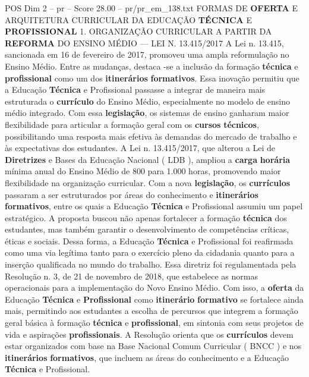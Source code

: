\begin{textsample}{POS Dim 2 – pr – Score 28.00 – pr/pr\_em\_138.txt}  \label{ex:f2_pos_115}
FORMAS DE \textbf{OFERTA} E ARQUITETURA CURRICULAR DA EDUCAÇÃO \textbf{TÉCNICA} E \textbf{PROFISSIONAL} 1.
ORGANIZAÇÃO CURRICULAR A PARTIR DA \textbf{REFORMA} DO ENSINO MÉDIO — LEI N. 13.415/2017 A Lei n. 13.415, sancionada em 16 de fevereiro de 2017, promoveu uma ampla reformulação no Ensino Médio.
Entre as mudanças, destaca -se a inclusão da formação \textbf{técnica} e \textbf{profissional} como um dos \textbf{itinerários} \textbf{formativos}.
Essa inovação permitiu que a Educação \textbf{Técnica} e Profissional passasse a integrar de maneira mais estruturada o \textbf{currículo} do Ensino Médio, especialmente no modelo de ensino médio integrado.
Com essa \textbf{legislação}, os sistemas de ensino ganharam maior flexibilidade para articular a formação geral com os \textbf{cursos} \textbf{técnicos}, possibilitando uma resposta mais efetiva às demandas do mercado de trabalho e às expectativas dos estudantes.
A Lei n. 13.415/2017, que alterou a Lei de \textbf{Diretrizes} e Bases da Educação Nacional ( LDB ), ampliou a \textbf{carga} \textbf{horária} mínima anual do Ensino Médio de 800 para 1.000 horas, promovendo maior flexibilidade na organização curricular.
Com a nova \textbf{legislação}, os \textbf{currículos} passaram a ser estruturados por áreas do conhecimento e \textbf{itinerários} \textbf{formativos}, entre os quais a Educação \textbf{Técnica} e Profissional assumiu um papel estratégico.
A proposta buscou não apenas fortalecer a formação \textbf{técnica} dos estudantes, mas também garantir o desenvolvimento de competências críticas, éticas e sociais.
Dessa forma, a Educação \textbf{Técnica} e Profissional foi reafirmada como uma via legítima tanto para o exercício pleno da cidadania quanto para a inserção qualificada no mundo do trabalho.
Essa diretriz foi regulamentada pela Resolução n. 3, de 21 de novembro de 2018, que estabelece as normas operacionais para a implementação do Novo Ensino Médio.
Com isso, a \textbf{oferta} da Educação \textbf{Técnica} e \textbf{Profissional} como \textbf{itinerário} \textbf{formativo} se fortalece ainda mais, permitindo aos estudantes a escolha de percursos que integrem a formação geral básica à formação \textbf{técnica} e \textbf{profissional}, em sintonia com seus projetos de vida e aspirações \textbf{profissionais}.
A Resolução orienta que os \textbf{currículos} devem estar organizados com base na Base Nacional Comum Curricular ( BNCC ) e nos \textbf{itinerários} \textbf{formativos}, que incluem as áreas do conhecimento e a Educação \textbf{Técnica} e Profissional.

\end{textsample}
